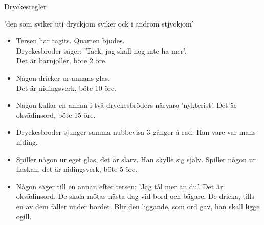 \begin{flushleft}
{\Huge Dryckesregler\\}
\end{flushleft}
{\large
'den som sviker uti dryckjom sviker ock i androm stjyckjom'
\begin{itemize}
\item Tersen har tagits. Quarten bjudes.\\ Dryckesbroder säger: 'Tack, jag 
skall nog inte ha mer'.\\ Det  är barnjoller, böte 2 öre.
\item Någon dricker ur annans glas. \\Det är nidingsverk, böte 10 öre.
\item Någon kallar en annan i två dryckesbröders närvaro 'nykterist'. 
Det är okvädinsord, böte 15 öre.
\item Dryckesbroder sjunger samma nubbevisa 3 gånger å rad. Han vare var 
mans niding.
\item Spiller någon ur eget glas, det är slarv. Han skylle sig själv. 
Spiller någon ur flaskan, det är nidingsverk, böte 5 öre.
\item Någon säger till en annan efter tersen: 'Jag tål mer än du'. Det 
är okvädinsord. De skola mötas nästa dag vid bord och bägare. De 
dricka, tills en av dem faller under bordet. Blir den liggande, som ord 
gav, han skall ligge ogill.
\end{itemize}
}

































